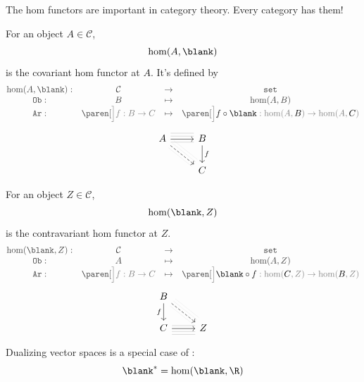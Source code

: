 \documentclass[a5paper]{scrartcl}
\def\cat{\mathcal{C}}
\def\setcat{\texttt{set}}
\newcommand{\obj}{\texttt{Ob}}
\newcommand{\arr}{\texttt{Ar}}
\newcommand{\black}[1]{{\color{black}#1}}
\DeclareMathOperator*{\Hom}{hom}
\def\hom{\Hom}
\begin{document}
The hom functors are important in category theory. Every category has them!
\begin{defn}
  For an object \(A\in\cat\),
  \[
    \hom(A,\blank)
  \]
  is the covariant hom functor at \(A\). It's defined by
  \[
    \color{darkgray}
    \begin{matrix}
      \hom(A,\blank) :& \cat &\to&\setcat \\
      \obj:& B &\mapsto& \hom(A,B) \\
      \arr:& \paren[\color{gray}\Big]{f:B \to C}& \mapsto& \paren[\color{gray}\Big]{ \black{f\circ \blank} : \hom(A,\black{B}) \to \hom(A,\black{C})}
    \end{matrix}
  \]
  \[
    \begin{tikzcd}
      A
      \ar[-,lightgray!36, shift left= 6pt]{dr}
      \ar[-,lightgray!36, shift left= 3pt]{dr}
      \ar[-,lightgray!36, shift left=-3pt]{dr}
      \ar[dashed]{dr}
      \rar[-,lightgray,shift left=-3pt]{}
      \rar[-,lightgray,shift left= 6pt]{}
      \rar[-,lightgray,shift left= 3pt]{}
      \rar
      & B\dar{f}
      \\
      & C
    \end{tikzcd}
  \]
\end{defn}
\begin{defn}\label{contrahom}
  For an object \(Z\in\cat\),
  \[
    \hom(\blank,Z)
  \]
  is the contravariant hom functor at \(Z\).
  \[
    \color{darkgray}
    \begin{matrix}
      \hom(\blank,Z) :& \cat &\to&\setcat \\
      \obj:& A &\mapsto& \hom(A,Z) \\
      \arr:& \paren[\color{gray}\Big]{f:B \to C}& \mapsto& \paren[\color{gray}\Big]{ \black{\blank\circ f} : \hom(\black C,Z) \to \hom(\black B,Z)}
    \end{matrix}
  \]
  \[
    \begin{tikzcd}
      B
      \ar[-,lightgray!36,shift left= 6pt]{rd}
      \ar[-,lightgray!36,shift left= 3pt]{rd}
      \ar[-,lightgray!36,shift left=-3pt]{rd}
      \ar[dashed]{rd}
      \dar[swap]{f}
      \\
      C
      \rar[-,lightgray,shift left= 3pt]{}
      \rar[-,lightgray,shift left=-3pt]{}
      \rar[-,lightgray,shift left=-6pt]{}
      \rar
      & Z
    \end{tikzcd}
  \]
\end{defn}
Dualizing vector spaces is a special case of :
\[  \blank^* = \hom(\blank, \R) \]
\end{document}
